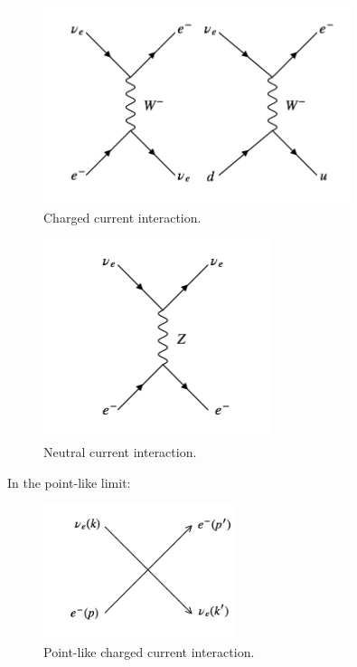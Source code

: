 \begin{figure}[!htb]
  \begin{center}
    \includegraphics[width=0.8\textwidth]{images/web_feynman/image_44.png}
    \caption[Charged current interaction]{Charged current interaction.}
    \label{fig:ch12_chargedCurrentInteraction}
  \end{center}
\end{figure}

\begin{figure}[!htb]
  \begin{center}
    \includegraphics[width=0.6\textwidth]{images/web_feynman/image_45.png}
    \caption[Neutral current interaction]{Neutral current interaction.}
    \label{fig:ch12_neutralCurrentInteraction}
  \end{center}
\end{figure}

In the point-like limit:

\begin{figure}[!htb]
  \begin{center}
    \includegraphics[width=0.5\textwidth]{images/web_feynman/image_46.png}
    \caption[Point-like charged current interaction]{Point-like charged current interaction.}
    \label{fig:ch12_chargedCurrentInteractionPointlike}
  \end{center}
\end{figure}

